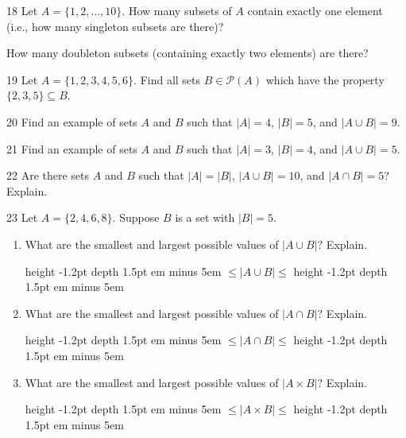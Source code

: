 \documentclass[11pt,]{book}
\newcommand{\fillin}[1]{\leavevmode\leaders\vrule height -1.2pt depth 1.5pt \hskip #1em minus #1em \null}
\theoremstyle{ptxplainnotitle}
\theoremstyle{ptxplaintitle}
\theoremstyle{ptxdefinitionnotitle}
\theoremstyle{ptxdefinitiontitle}
\theoremstyle{ptxdefinitionnotitle}
\theoremstyle{ptxdefinitiontitle}
\theoremstyle{ptxdefinitionnotitle}
\theoremstyle{ptxdefinitiontitle}
\theoremstyle{ptxdefinitiontitlenonumber}
\theoremstyle{ptxdefinitiontitlenonumber}
\numberwithin{equation}{chapter}
\newcommand{\pow}{\mathcal P}
\begin{document}
\begin{divisionexercise}{18}\hypertarget{exercise-95}{}
\hypertarget{p-921}{}%
Let \(A = \{1,2,\ldots, 10\}\text{.}\) How many subsets of \(A\) contain exactly one element (i.e., how many singleton subsets are there)?%
\par
\hypertarget{p-923}{}%
How many doubleton subsets (containing exactly two elements) are there?%
\end{divisionexercise}%
\begin{divisionexercise}{19}\hypertarget{exercise-96}{}
\hypertarget{p-926}{}%
Let \(A = \{1,2,3,4,5,6\}\). Find all sets \(B \in \pow(A)\) which have the property \(\{2,3,5\} \subseteq B\).%
\end{divisionexercise}%
\begin{divisionexercise}{20}\hypertarget{exercise-97}{}
\hypertarget{p-927}{}%
Find an example of sets \(A\) and \(B\) such that \(|A| = 4\), \(|B| = 5\), and \(|A \cup B| = 9\).%
\end{divisionexercise}%
\begin{divisionexercise}{21}\hypertarget{exercise-98}{}
\hypertarget{p-929}{}%
Find an example of sets \(A\) and \(B\) such that \(|A| = 3\), \(|B| = 4\), and \(|A \cup B| = 5\).%
\end{divisionexercise}%
\begin{divisionexercise}{22}\hypertarget{exercise-99}{}
\hypertarget{p-930}{}%
Are there sets \(A\) and \(B\) such that \(|A| = |B|\), \(|A\cup B| = 10\), and \(|A\cap B| = 5\)? Explain.%
\end{divisionexercise}%
\begin{divisionexercise}{23}\hypertarget{exercise-100}{}
\hypertarget{p-938}{}%
Let \(A = \{2, 4, 6, 8\}\text{.}\)  Suppose \(B\) is a set with \(|B| = 5\text{.}\) \leavevmode%
\begin{enumerate}[label=\alph*.]
\item\hypertarget{li-425}{}\hypertarget{p-939}{}%
What are the smallest and largest possible values of \(|A \cup B|\text{?}\)  Explain.%
\par
\hypertarget{p-940}{}%
 \fillin{5} \(\le |A \cup B| \le\)  \fillin{5}%
\item\hypertarget{li-426}{}\hypertarget{p-941}{}%
What are the smallest and largest possible values of \(|A \cap B|\text{?}\)  Explain.%
\par
\hypertarget{p-942}{}%
 \fillin{5} \(\le |A \cap B| \le\)  \fillin{5}%
\item\hypertarget{li-427}{}\hypertarget{p-943}{}%
What are the smallest and largest possible values of \(|A \times B|\text{?}\)  Explain.%
\par
\hypertarget{p-944}{}%
 \fillin{5} \(\le |A \times B| \le\)  \fillin{5}%
\end{enumerate}
%
\end{divisionexercise}%
\end{document}
